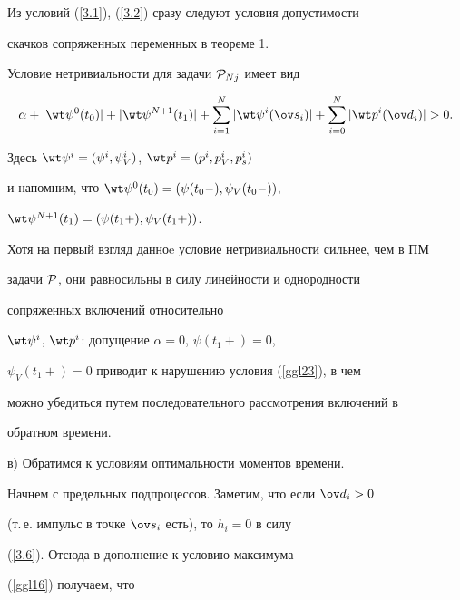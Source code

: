 Из условий (\ref{3.1}), (\ref{3.2}) сразу следуют условия допустимости


скачков сопряженных переменных в теореме 1.





Условие нетривиальности для задачи ${\cal P}_{Nj}$ имеет вид


\begin{equation}


\alpha+|\wt \psi^0(t_0)|+|\wt \psi^{N+1}(t_1)|+


\sum_{i=1}^N|\wt \psi^i(\ov s_i)|+


\sum_{i=0}^N|\wt p^i(\ov d_i)|>0.


\label{ggl23}


\end{equation}





Здесь $\wt\psi^i=(\psi^i,\psi_V^i)$, $\wt p^i=(p^i,p_V^i,p_s^i)$


и напомним, что $\wt\psi^0(t_0)=(\psi(t_0-), \psi_V(t_0-))$,


$\wt\psi^{N+1}(t_1)=(\psi(t_1+),\psi_V(t_1+))$.





Хотя на первый взгляд данноe условие нетривиальности сильнее, чем в ПМ


задачи ${\cal P}$, они равносильны в силу линейности и однородности


сопряженных включений относительно


$\wt\psi^i$, $\wt p^i$: допущение $\alpha=0$, $\psi(t_1+)=0$,


$\psi_V(t_1+)=0$ приводит к нарушению условия (\ref{ggl23}), в чем


можно убедиться путем последовательного рассмотрения включений в


обратном времени.


\smallskip





в) Обратимся к условиям оптимальности моментов времени.


Начнем с предельных подпроцессов. Заметим, что если $\ov d_i>0$


(т.\,е. импульс в точке $\ov s_i$ есть), то $h_i=0$ в силу


(\ref{3.6}). Отсюда в дополнение к условию максимума


(\ref{ggl16}) получаем, что



